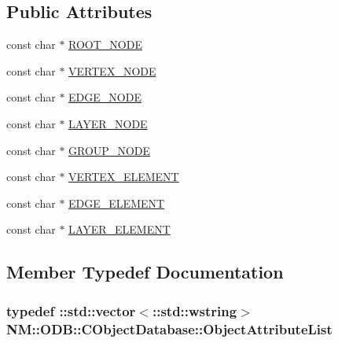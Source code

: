\subsection*{Public Attributes}
\begin{DoxyCompactItemize}
\item 
const char $\ast$ \hyperlink{class_n_m_1_1_o_d_b_1_1_c_object_database_ac0053b2d7456d29b9377eae996607e9d}{R\+O\+O\+T\+\_\+\+N\+O\+D\+E}
\item 
const char $\ast$ \hyperlink{class_n_m_1_1_o_d_b_1_1_c_object_database_a230b67b21d543d6f4c61e9224263a6a4}{V\+E\+R\+T\+E\+X\+\_\+\+N\+O\+D\+E}
\item 
const char $\ast$ \hyperlink{class_n_m_1_1_o_d_b_1_1_c_object_database_abcbc842608896d0649521ef4a3ca7841}{E\+D\+G\+E\+\_\+\+N\+O\+D\+E}
\item 
const char $\ast$ \hyperlink{class_n_m_1_1_o_d_b_1_1_c_object_database_acec9bb950e14a68b0d145b4310f21b4a}{L\+A\+Y\+E\+R\+\_\+\+N\+O\+D\+E}
\item 
const char $\ast$ \hyperlink{class_n_m_1_1_o_d_b_1_1_c_object_database_a230d914400de585aea35da738869a152}{G\+R\+O\+U\+P\+\_\+\+N\+O\+D\+E}
\item 
const char $\ast$ \hyperlink{class_n_m_1_1_o_d_b_1_1_c_object_database_af053ab94fadcb52340487f7d227b20df}{V\+E\+R\+T\+E\+X\+\_\+\+E\+L\+E\+M\+E\+N\+T}
\item 
const char $\ast$ \hyperlink{class_n_m_1_1_o_d_b_1_1_c_object_database_ab45565354d5ce99da286da75e1f77bf6}{E\+D\+G\+E\+\_\+\+E\+L\+E\+M\+E\+N\+T}
\item 
const char $\ast$ \hyperlink{class_n_m_1_1_o_d_b_1_1_c_object_database_a656de40e11444b6b46259b150a0af2bb}{L\+A\+Y\+E\+R\+\_\+\+E\+L\+E\+M\+E\+N\+T}
\end{DoxyCompactItemize}


\subsection{Member Typedef Documentation}
\hypertarget{class_n_m_1_1_o_d_b_1_1_c_object_database_af71c35cd26a6e83732da7ae538c665a0}{}
\subsubsection[{Object\+Attribute\+List}]{\setlength{\rightskip}{0pt plus 5cm}typedef \+::std\+::vector$<$\+::std\+::wstring$>$ {\bf N\+M\+::\+O\+D\+B\+::\+C\+Object\+Database\+::\+Object\+Attribute\+List}}\label{class_n_m_1_1_o_d_b_1_1_c_object_database_af71c35cd26a6e83732da7ae538c665a0}


